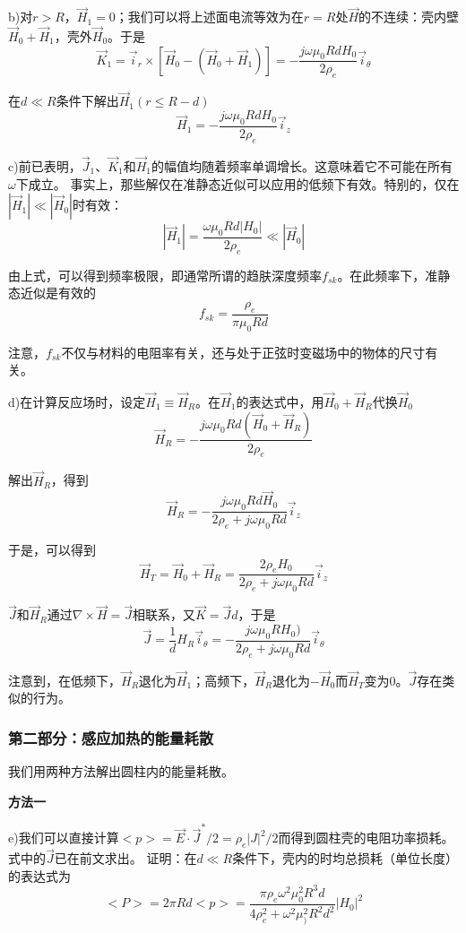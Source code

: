 b)对$r>R$，$\vec{H}_1=0$；我们可以将上述面电流等效为在$r=R$处$\vec{H}$的不连续：壳内壁$\vec{H}_0+\vec{H}_1$，壳外$\vec{H}_0$。于是
$$\vec{K}_1=\vec{i}_r \times [\vec{H}_0-(\vec{H}_0+\vec{H}_1)]=-\frac{j\omega \mu_0 R d H_0}{2\rho_e}\vec{i}_\theta$$

在$d\ll R$条件下解出$\vec{H}_1(r\le R-d)$
$$\vec{H}_1=-\frac{j\omega \mu_0 R d H_0}{2\rho_e}\vec{i}_z$$

c)前已表明，$\vec{J}_1$、$\vec{K}_1$和$\vec{H}_1$的幅值均随着频率单调增长。这意味着它不可能在所有$\omega$下成立。
事实上，那些解仅在准静态近似可以应用的低频下有效。特别的，仅在$|\vec{H}_1|\ll |\vec{H}_0|$时有效：
$$|\vec{H}_1|=\frac{\omega \mu_0 R d |H_0|}{2\rho_e}\ll |\vec{H}_0|$$

由上式，可以得到频率极限，即通常所谓的趋肤深度频率$f_{sk}$。在此频率下，准静态近似是有效的
$$f_{sk}=\frac{\rho_e}{\pi \mu_0 R d}$$

注意，$f_{sk}$不仅与材料的电阻率有关，还与处于正弦时变磁场中的物体的尺寸有关。

d)在计算反应场时，设定$\vec{H}_1\equiv \vec{H}_R$。在$\vec{H}_1$的表达式中，用$\vec{H}_0+\vec{H}_R$代换$\vec{H}_0$
$$\vec{H}_R=-\frac{j\omega \mu_0 R d (\vec{H}_0+\vec{H}_R)}{2\rho_e}$$

解出$\vec{H}_R$，得到
$$\vec{H}_R=-\frac{j\omega \mu_0 R d \vec{H}_0}{2\rho_e+j\omega \mu_0 R d}\vec{i}_z$$

于是，可以得到
$$\vec{H}_T=\vec{H}_0+\vec{H}_R=\frac{2\rho_e H_0}{2\rho_e+j\omega \mu_0 R d}\vec{i}_z$$

$\vec{J}$和$\vec{H}_R$通过$\nabla\times \vec{H}=\vec{J}$相联系，又$\vec{K}=\vec{J}d$，于是
$$\vec{J}=\frac{1}{d}H_R \vec{i}_\theta=-\frac{j\omega \mu_0 R H_0)}{2\rho_e+j\omega \mu_0 R d}\vec{i}_\theta$$

注意到，在低频下，$\vec{H}_R$退化为$\vec{H}_1$；高频下，$\vec{H}_R$退化为$-\vec{H}_0$而$\vec{H}_T$变为0。$\vec{J}$存在类似的行为。

\subsubsection*{第二部分：感应加热的能量耗散}
我们用两种方法解出圆柱内的能量耗散。

\textbf{方法一}

e)我们可以直接计算$<p>=\vec{E}\cdot \vec{J}^* /2=\rho_e |J|^2 /2$而得到圆柱壳的电阻功率损耗。式中的$\vec{J}$已在前文求出。
证明：在$d\ll R$条件下，壳内的时均总损耗（单位长度）的表达式为
$$<P>=2\pi R d<p>=\frac{\pi \rho_e \omega^2 \mu_0^2 R^3 d}{4\rho_e^2+\omega^2\mu_)^2 R^2 d^2} |H_0|^2$$

